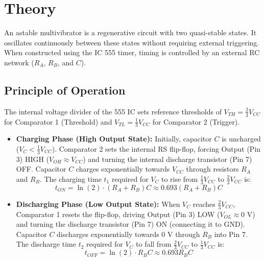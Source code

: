 \section{Theory}
An astable multivibrator is a regenerative circuit with two quasi-stable states. It oscillates continuously between these states without requiring external triggering. When constructed using the IC 555 timer, timing is controlled by an external RC network ($R_A$, $R_B$, and $C$).

\subsection{Principle of Operation}
The internal voltage divider of the 555 IC sets reference thresholds of $V_{TH} = \frac{2}{3} V_{CC}$ for Comparator 1 (Threshold) and $V_{TL} = \frac{1}{3} V_{CC}$ for Comparator 2 (Trigger).

\begin{itemize}
\item \textbf{Charging Phase (High Output State):} Initially, capacitor $C$ is uncharged ($V_C < \frac{1}{3} V_{CC}$). Comparator 2 sets the internal RS flip-flop, forcing Output (Pin 3) HIGH ($V_{OH} \approx V_{CC}$) and turning the internal discharge transistor (Pin 7) OFF. Capacitor $C$ charges exponentially towards $V_{CC}$ through resistors $R_A$ and $R_B$. The charging time $t_1$ required for $V_C$ to rise from $\frac{1}{3} V_{CC}$ to $\frac{2}{3} V_{CC}$ is:
\begin{equation}
	t_{ON} = \ln(2) \cdot (R_A + R_B) C \approx 0.693 (R_A + R_B) C
\end{equation}

\item \textbf{Discharging Phase (Low Output State):} When $V_C$ reaches $\frac{2}{3} V_{CC}$, Comparator 1 resets the flip-flop, driving Output (Pin 3) LOW ($V_{OL} \approx 0\text{ V}$) and turning the discharge transistor (Pin 7) ON (connecting it to GND). Capacitor $C$ discharges exponentially towards $0\text{ V}$ through $R_B$ into Pin 7. The discharge time $t_2$ required for $V_C$ to fall from $\frac{2}{3} V_{CC}$ to $\frac{1}{3} V_{CC}$ is:
\begin{equation}
	t_{OFF} = \ln(2) \cdot R_B C \approx 0.693 R_B C
\end{equation}
\end{itemize}

